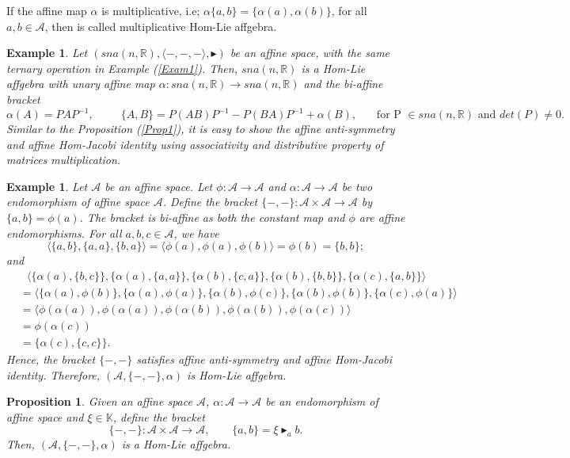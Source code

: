 \documentclass[14pt]{article}
\newtheorem{Prop}[thm]{Proposition}
\theoremstyle{Definition}
\newtheorem{Exam}[thm]{Example}
\theoremstyle{remark}
\begin{document}
If the affine map $\alpha$ is multiplicative, i.e; $\alpha\{a,b\}=\{\alpha(a),\alpha(b)\}$, for all $a,b\in \mathcal{A}$, then is called multiplicative Hom-Lie affgebra.
\begin{Exam}
Let $(sna(n,\mathbb{R}),\langle-,-,-\rangle,\blacktriangleright)$ be an affine space, with the same ternary operation in Example (\ref{Exam1}). Then, $sna(n,\mathbb{R})$ is a Hom-Lie affgebra with unary affine map $\alpha:sna(n,\mathbb{R})\rightarrow sna(n,\mathbb{R})$ and the bi-affine bracket 
$$\alpha(A)=PAP^{-1},~~~~~~~~~~~\{A,B\}=P(AB)P^{-1}-P(BA)P^{-1}+\alpha(B),~~~~~~~~\text{for P $\in sna(n,\mathbb{R})$ and $det(P)\neq 0$.}$$
Similar to the Proposition (\ref{Prop1}), it is easy to show the affine anti-symmetry and affine Hom-Jacobi identity using associativity and distributive property of matrices multiplication.
\end{Exam}
\begin{Exam}
Let $\mathcal{A}$ be an affine space. Let $\phi:\mathcal{A}\rightarrow\mathcal{A}$ and $\alpha:\mathcal{A}\rightarrow\mathcal{A}$ be two endomorphism of affine space $\mathcal{A}$. Define the bracket $\{-,-\}:\mathcal{A}\times\mathcal{A}\rightarrow\mathcal{A}$ by $\{a,b\}=\phi(a)$. The bracket is bi-affine as both the constant map and $\phi$ are affine endomorphisms. For all $a,b,c\in \mathcal{A}$, we have
$$
\langle\{a,b\},\{a,a\},\{b,a\}\rangle=\langle\phi(a),\phi(a),\phi(b)\rangle=\phi(b)=\{b,b\};
$$
and
\begin{align*}
&~~~\langle\{\alpha(a),\{b,c\}\},\{\alpha(a),\{a,a\}\},\{\alpha(b),\{c,a\}\},\{\alpha(b),\{b,b\}\},\{\alpha(c),\{a,b\}\}\rangle\\
&=\langle\{\alpha(a),\phi(b)\},\{\alpha(a),\phi(a)\},\{\alpha(b),\phi(c)\},\{\alpha(b),\phi(b)\},\{\alpha(c),\phi(a)\}\rangle\\
&=\langle\phi(\alpha(a)),\phi(\alpha(a)),\phi(\alpha(b)),\phi(\alpha(b)),\phi(\alpha(c))\rangle\\
&=\phi(\alpha(c))\\
&=\{\alpha(c),\{c,c\}\}.
\end{align*}
Hence, the bracket $\{-,-\}$ satisfies affine anti-symmetry and affine Hom-Jacobi identity. Therefore, $(\mathcal{A},\{-,-\},\alpha)$ is Hom-Lie affgebra.
\end{Exam}
\begin{Prop}
Given an affine space $\mathcal{A}$, $\alpha:\mathcal{A}\rightarrow\mathcal{A}$ be an endomorphism of affine space and $\xi\in \mathbb{K}$, define the bracket
$$
\{-,-\}:\mathcal{A}\times\mathcal{A}\rightarrow\mathcal{A},~~~~~~~~~\{a,b\}=\xi\blacktriangleright_{a}b.
$$
Then, $(\mathcal{A},\{-,-\},\alpha)$ is a Hom-Lie affgebra.
\end{Prop}
\end{document}
